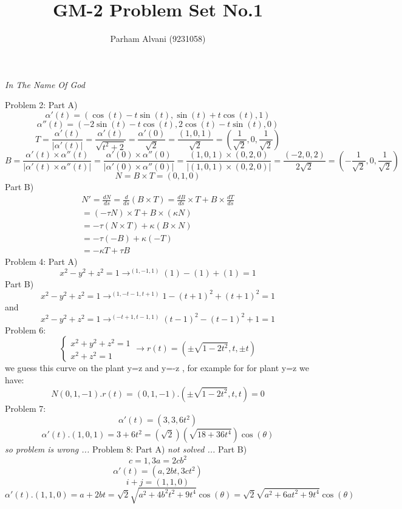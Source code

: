 \documentclass{article}
\author{Parham Alvani (9231058)}
\title{GM-2 Problem Set No.1}
\begin{document}
\begin{titlepage}
\begin{center}
\emph{In The Name Of God}
\end{center}
\maketitle
\end{titlepage}
Problem 2: Part A)
$$
\alpha'(t)=(\cos(t)-t\sin(t),\sin(t)+t\cos(t),1)
$$
$$
\alpha''(t)=(-2\sin(t)-t\cos(t),2\cos(t)-t\sin(t),0)
$$
$$
T=\frac{\alpha'(t)}{|\alpha'(t)|}=\frac{\alpha'(t)}{\sqrt{t^2+2}}=\frac{\alpha'(0)}{\sqrt{2}}
=
\frac{(1,0,1)}{\sqrt{2}}
=
(\frac{1}{\sqrt{2}},0,\frac{1}{\sqrt{2}})
$$
$$
B=\frac{\alpha'(t)\times\alpha''(t)}{|\alpha'(t)\times\alpha''(t)|}
=
\frac{\alpha'(0)\times\alpha''(0)}{|\alpha'(0)\times\alpha''(0)|}
=
\frac{(1,0,1)\times(0,2,0)}{|(1,0,1)\times(0,2,0)|}
=
\frac{(-2,0,2)}{2\sqrt{2}}
=
(-\frac{1}{\sqrt{2}},0,\frac{1}{\sqrt{2}})
$$
$$
N=B \times T = (0,1,0)
$$
Part B)
\begin{eqnarray}
N'=\frac{dN}{ds}=\frac{d}{ds}(B \times T)=\frac{dB}{ds}\times T+B\times \frac{dT}{ds}\\
=(-\tau N)\times T + B \times (\kappa N)\\
=-\tau (N \times T) + \kappa (B \times N)\\
=-\tau (-B) + \kappa(-T)\\
=-\kappa T + \tau B
\end{eqnarray}
Problem 4: Part A)
$$
x^2-y^2+z^2=1
\rightarrow^{(1,-1,1)}
(1)-(1)+(1)=1
$$
Part B)
$$
x^2-y^2+z^2=1
\rightarrow^{(1,-t-1,t+1)}
1-(t+1)^2+(t+1)^2=1
$$
and
$$
x^2-y^2+z^2=1
\rightarrow^{(-t+1,t-1,1)}
(t-1)^2-(t-1)^2+1=1
$$
Problem 6:
$$
\left\lbrace\begin{array}{c}
x^2+y^2+z^2=1\\
x^2+z^2=1
\end{array}\right.
\rightarrow
r(t)=(\pm\sqrt{1-2t^2},t,\pm t)
$$
we guess this curve on the plant y=z and y=-z , for example for for plant y=z we have:
$$
N(0,1,-1).r(t)
=
(0,1,-1).(\pm\sqrt{1-2t^2},t,t)
=
0
$$
Problem 7:
$$
\alpha'(t)=(3,3,6t^2)
$$
$$
\alpha'(t).(1,0,1)
=
3+6t^2
=
(\sqrt{2})(\sqrt{18+36t^4})\cos(\theta)
$$
\textit{so problem is wrong ...}
\newline
Problem 8: Part A)
\textit{not solved ...}
\newline
Part B)
$$
c=1,3a=2cb^2
$$
$$
\alpha'(t)=(a,2bt,3ct^2)
$$
$$
i+j=(1,1,0)
$$
$$
\alpha'(t).(1,1,0)
=
a+2bt
=
\sqrt{2}\sqrt{a^2+4b^2t^2+9t^4}\cos(\theta)
=
\sqrt{2}\sqrt{a^2+6at^2+9t^4}\cos(\theta)
$$
\end{document}
